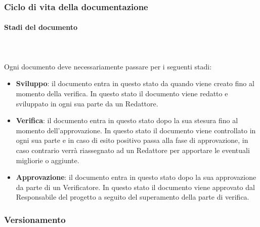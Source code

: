 	\subsubsection{Ciclo di vita della documentazione}
	\paragraph{Stadi del documento} \mbox{}\\ \mbox{}\\
	Ogni documento deve necessariamente passare per i seguenti stadi:
	\begin{itemize}
		\item \textbf{Sviluppo}: il documento entra in questo stato da quando viene creato fino al momento della verifica. In questo stato il documento viene redatto e sviluppato in ogni sua parte da un Redattore.
		\item \textbf{Verifica}: il documento entra in questo stato dopo la sua stesura fino al momento dell'approvazione. In questo stato il documento viene controllato in ogni sua parte e in caso di esito positivo passa alla fase di approvazione, in caso contrario verrà riassegnato ad un Redattore per apportare le eventuali migliorie o aggiunte.
		\item \textbf{Approvazione}: il documento entra in questo stato dopo la sua approvazione da parte di un Verificatore. In questo stato il documento viene approvato dal Responsabile del progetto a seguito del superamento della parte di verifica.
	\end{itemize}
	\subsubsection{Versionamento}
